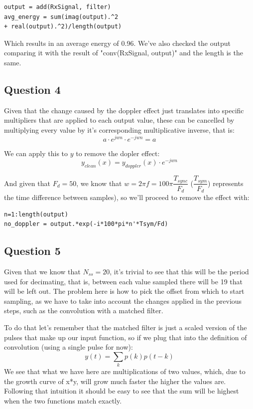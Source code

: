 \documentclass[conference,9pt]{IEEEtran}
\begin{document}
\begin{verbatim}
output = add(RxSignal, filter)
avg_energy = sum(imag(output).^2 
+ real(output).^2)/length(output)
\end{verbatim}

Which results in an average energy of 0.96. We've also checked the output comparing it with the result of "conv(RxSignal, output)" and the length is the same.

\subsection{Question 4}
Given that the change caused by the doppler effect just translates into specific multipliers that are applied to each output value, these can be cancelled by multiplying every value by it's corresponding multiplicative inverse, that is:
$$a\cdot e^{jwn} \cdot e^{-jwn} = a$$

We can apply this to $y$ to remove the dopler effect:
$$y_{clean}(x)=y_{doppler}(x)\cdot e^{-jwn}$$

And given that $F_d=50$, we know that $w=2\pi f=100\pi \dfrac{T_{sync}}{F_d}$ ($\dfrac{T_{sym}}{F_d}$) represents the time difference between samples), so we'll proceed to remove the effect with:
\begin{verbatim}
n=1:length(output)
no_doppler = output.*exp(-i*100*pi*n'*Tsym/Fd)
\end{verbatim}

\subsection{Question 5}
Given that we know that $N_{ss}=20$, it's trivial to see that this will be the period used for decimating, that is, between each value sampled there will be 19 that will be left out. The problem here is how to pick the offset from which to start sampling, as we have to take into account the changes applied in the previous steps, such as the convolution with a matched filter.

To do that let's remember that the matched filter is just a scaled version of the pulses that make up our input function, so if we plug that into the definition of convolution (using a single pulse for now):
$$y(t)=\sum_{k} p(k)p(t-k)$$
We see that what we have here are multiplications of two values, which, due to the growth curve of x*y, will grow much faster the higher the values are. Following that intuition it should be easy to see that the sum will be highest when the two functions match exactly.
\end{document}
